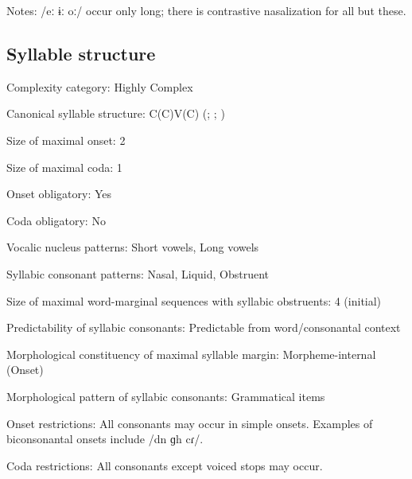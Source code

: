 {\begin{appendixdesc}
\item[Notes:] /eː ɨː oː/ occur only long; there is contrastive nasalization for all but these.
\end{appendixdesc}
\subsection*{Syllable structure}
\begin{appendixdesc}

\item[Complexity category:] Highly Complex 

\item[Canonical syllable structure:] C(C)V(C) (\citealt{Diffloth1976a,Diffloth1976b}; \citealt{Sloan1988}; \citealt{Philips2007})

\item[Size of maximal onset:] 2

\item[Size of maximal coda:] 1

\item[Onset obligatory:] Yes

\item[Coda obligatory:] No

\item[Vocalic nucleus patterns:] Short vowels, Long vowels

\item[Syllabic consonant patterns:] Nasal, Liquid, Obstruent

\item[Size of maximal word-marginal sequences with syllabic obstruents:] 4 (initial)

\item[Predictability of syllabic consonants:] Predictable from word/consonantal context

\item[Morphological constituency of maximal syllable margin:] Morpheme-internal (Onset)

\item[Morphological pattern of syllabic consonants:] Grammatical items

\item[Onset restrictions:] All consonants may occur in simple onsets. Examples of biconsonantal onsets include /dn ɡh cɾ/.

\item[Coda restrictions:] All consonants except voiced stops may occur.


\end{appendixdesc}}
